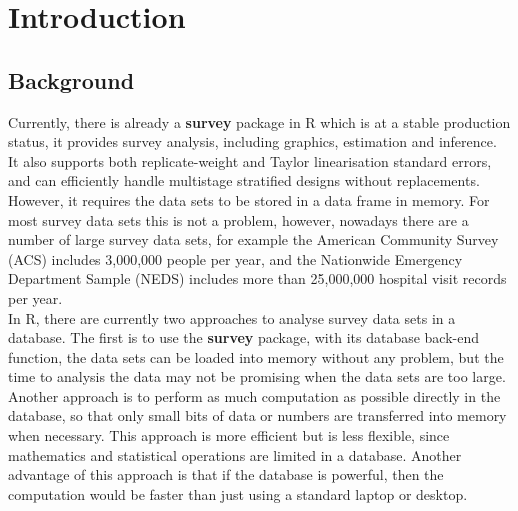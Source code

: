 
\chapter{Introduction} %

\label{Introduction} %


\section{Background}\label{c1.1}

Currently, there is already a {\bf survey} package  \citep{surveypackage} in {\sf R} which is at a stable production status, it provides survey analysis, including graphics, estimation and inference. It also supports both replicate-weight and Taylor linearisation standard errors, and can efficiently handle multistage stratified designs without replacements. However, it requires the data sets to be stored in a data frame in memory. For most survey data sets this is not a problem, however, nowadays there are a number of large survey data sets, for example the American Community Survey (ACS) includes 3,000,000 people per year, and the Nationwide Emergency Department Sample (NEDS) includes more than 25,000,000 hospital visit records per year. \\

In {\sf R}, there are currently two approaches to analyse survey data sets in a database. The first is to use the {\bf survey} package, with its database back-end function, the data sets can be loaded into memory without any problem, but the time to analysis the data may not be promising when the data sets are too large.\\

Another approach is to perform as much computation as possible directly in the database, so that only small bits of data or numbers are transferred into memory when necessary. This approach is more efficient but is less flexible, since mathematics and statistical operations are limited in a database. Another advantage of this approach is that if the database is powerful, then the computation would be faster than just using a standard laptop or desktop. 

